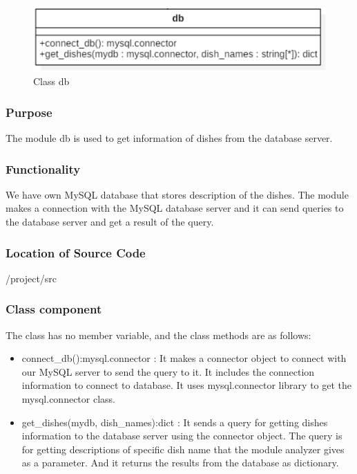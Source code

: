 \begin{figure}[htbp]
\centerline{\includegraphics[width=\linewidth]{./pictures/class_db}}
\caption{Class db}
\label{fig:class_db}
\end{figure}
\FloatBarrier

\subsubsection {Purpose}

The module db is used to get information of dishes from the database server. \newline
\subsubsection {Functionality}

We have own MySQL database that stores description of the dishes. The module makes a connection with the MySQL database server and it can send queries to the database server and get a result of the query. \newline


\subsubsection {Location of Source Code}

/project/src \newline

\subsubsection {Class component}

The class has no member variable, and the class methods are as follows: \newline

\begin{itemize}
\item connect\_db():mysql.connector :  It makes a connector object to connect with our MySQL server to send the query to it. It includes the connection information to connect to database. It uses mysql.connector library to get the mysql.connector class. \newline

\item get\_dishes(mydb, dish\_names):dict : It sends a query for getting dishes information to the database server using the connector object. The query is for getting descriptions of specific dish name that the module analyzer gives as a parameter. And it returns the results from the database as dictionary. \newline
\end{itemize}

